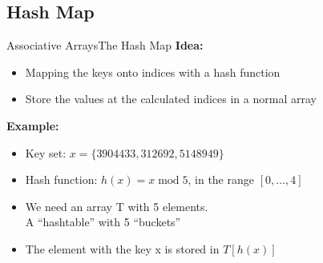 \subsection{Hash Map}

\begin{frame}{Associative Arrays}{The Hash Map}
  \textbf{Idea:}
  \begin{itemize}
    \item
      Mapping the keys onto indices with a {\color{MainA}hash function}
    \item
      Store the values at the calculated indices in a normal array
  \end{itemize}
  \textbf{Example:}
  \begin{itemize}
    \item
      Key set: $x = \{3904433, 312692, 5148949\}$
     \item
      Hash function:
      {\color{MainA}$h(x) = x \;\mathrm{mod}\; 5$},
      in the range {\color{MainA} $[0, \ldots, 4]$ }
     \item We need an array {\color{MainA}T}
      with {\color{MainA}5} elements.\\
      A \enquote{hashtable} with 5 \enquote{buckets}
     \item
      The element with the key {\color{MainA}x}
      is stored in {\color{MainA}$T[h(x)]$}
  \end{itemize}
\end{frame}


